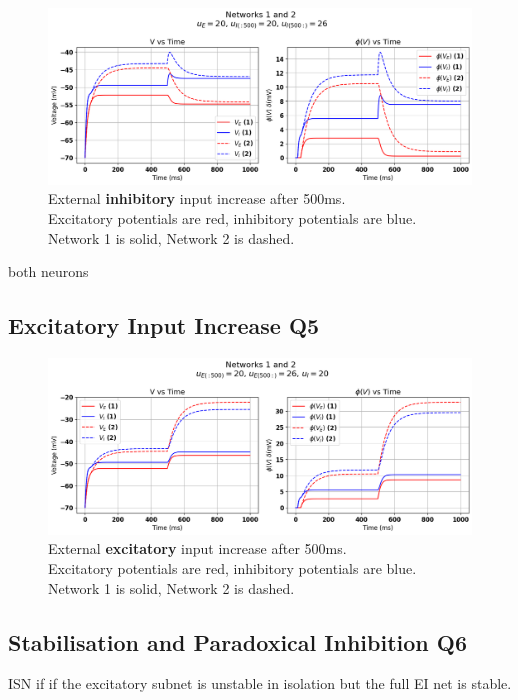 \documentclass[10pt,twocolumn]{article}
\begin{document}
\begin{figure}
    \centering
    \captionsetup{justification=centering}
    \includegraphics[width=1\textwidth]{images/12-I_input.png}
    \caption{External \textbf{inhibitory} input increase after 500ms.\\
        Excitatory potentials are red, inhibitory potentials are blue.\\
        Network 1 is solid, Network 2 is dashed.}
    \label{fig:i-input}
\end{figure}

both neurons

\subsection{Excitatory Input Increase Q5}

\begin{figure}
    \centering
    \captionsetup{justification=centering}
    \includegraphics[width=1\textwidth]{images/12-E_input.png}
    \caption{External \textbf{excitatory} input increase after 500ms. \\
        Excitatory potentials are red, inhibitory potentials are blue.\\
        Network 1 is solid, Network 2 is dashed.}
    \label{fig:e-input}
\end{figure}

\subsection{Stabilisation and Paradoxical Inhibition Q6}
ISN if if the excitatory subnet is unstable in isolation
but the full EI net is stable.
\end{document}
